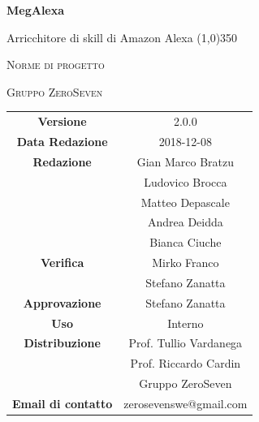 \documentclass[a4paper,12pt,openany]{book}
\author{Bratzu Gian Marco}
\date{2018-12-08}
\begin{document}
\begin{titlepage}
	\centering
	{\huge\bfseries MegAlexa\par}
	Arricchitore di skill di Amazon Alexa
	\line(1,0){350} \\
	{\scshape\LARGE Norme di progetto \par}
	\vspace{1cm}
	{\scshape Gruppo ZeroSeven \par}
	\logo
	\begin{tabular}{c|c}
		{\hfill \textbf{Versione}} 			& 2.0.0				\\
		{\hfill\textbf{Data Redazione}} 	& 2018-12-08		\\ 
		{\hfill\textbf{Redazione}} 			&  		Gian Marco Bratzu\\&Ludovico Brocca\\&Matteo Depascale\\&Andrea Deidda\\&Bianca Ciuche\\
		{\hfill\textbf{Verifica}} 				&  	Mirko Franco\\& Stefano Zanatta	\\ 
		{\hfill\textbf{Approvazione}} 		&  		Stefano Zanatta			\\ 
		{\hfill\textbf{Uso}} 					& 		Interno		\\ 
		{\hfill\textbf{Distribuzione}} 			& 			Prof. Tullio Vardanega \\ & Prof. Riccardo Cardin \\ & Gruppo ZeroSeven \\
		{\hfill\textbf{Email di contatto}} & zerosevenswe@gmail.com \\
	\end{tabular}
\end{titlepage}
	

	
	\label{LastFrontPage}
	\newpage	
	
	\pagestyle{mymain}
	\tableofcontents
	
	
	
	
	\appendix
			
			
	\label{LastPage}
\end{document}

